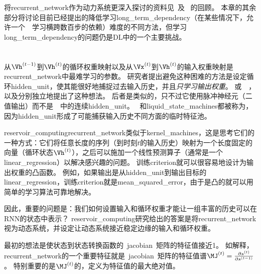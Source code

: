 将\gls{recurrent_network}作为动力系统更深入探讨的资料见~\cite{Doya-1993,Bengio-et-al-1994,Siegelmann-Sontag-1995}及~
\cite{Pascanu-et-al-2013}的回顾。
本章的其余部分将讨论目前已经提出的降低学习\gls{long_term_dependency}（在某些情况下，允许一个~~学习横跨数百步的依赖）难度的不同方法，但学习\gls{long_term_dependency}的问题仍是\gls{DL}中的一个主要挑战。


\section{}
\label{sec:echo_state_networks}
从$\Vh^{(t-1)}$到$\Vh^{(t)}$的循环权重映射以及从$\Vx^{(t)}$到$\Vh^{(t)}$的输入权重映射是\gls{recurrent_network}中最难学习的参数。
研究者\citep{Jaeger-2003,Maass-et-al-2002,Jaeger-Haas-2004,Jaeger-2007b}提出避免这种困难的方法是设定循环\gls{hidden_unit}，使其能很好地捕捉过去输入历史，并且\emph{只学习输出权重}。
或~~\citep{Jaeger-Haas-2004,Jaeger-2007b}，以及\citep{Maass-et-al-2002}分别独立地提出了这种想法。
后者是类似的，只不过它使用脉冲神经元（二值输出）而不是~~中的连续\gls{hidden_unit}。
~和\gls{liquid_state_machines}都被称为\citep{Lukosevicius-Jaeger-2009}，因为\gls{hidden_unit}形成了可能捕获输入历史不同方面的临时特征池。


\gls{reservoir_computing}\gls{recurrent_network}类似于\gls{kernel_machines}，这是思考它们的一种方式：它们将任意长度的序列（到时刻$t$的输入历史）映射为一个长度固定的向量（循环状态$\Vh^{(t)}$），之后可以施加一个线性预测算子（通常是一个\gls{linear_regression}）以解决感兴趣的问题。
训练\gls{criterion}就可以很容易地设计为输出权重的凸函数。
例如，如果输出是从\gls{hidden_unit}到输出目标的\gls{linear_regression}，训练\gls{criterion}就是\gls{mean_squared_error}，由于是凸的就可以用简单的学习算法可靠地解决\citep{Jaeger-2003}。

因此，重要的问题是：我们如何设置输入和循环权重才能让一组丰富的历史可以在\gls{RNN}的状态中表示？
\gls{reservoir_computing}研究给出的答案是将\gls{recurrent_network}视为动态系统，并设定让动态系统接近稳定边缘的输入和循环权重。

最初的想法是使状态到状态转换函数的~\gls{jacobian}~矩阵的特征值接近1。
如解释，\gls{recurrent_network}的一个重要特征就是~\gls{jacobian}~矩阵的特征值谱$\MJ^{(t)} = \frac{\partial s^{(t)}}{\partial s^{(t-1)}}$。
特别重要的是$\MJ^{(t)}$的，定义为特征值的最大绝对值。

